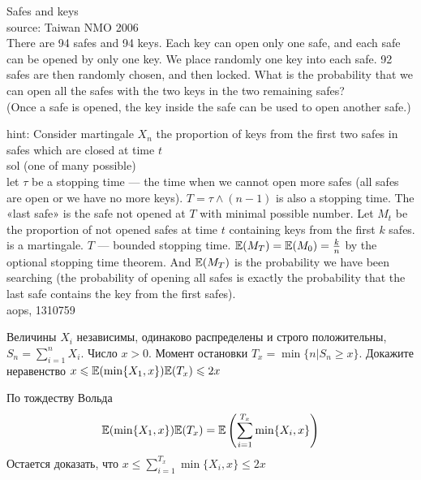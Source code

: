 \begin{problem}
Safes and keys \\
source: Taiwan NMO 2006\\
There are 94 safes and 94 keys. Each key can open only one safe, and each safe can be opened by only one key. We place randomly one key into each safe. 92 safes are then randomly chosen, and then locked. What is the probability that we can open all the safes with the two keys in the two remaining safes?\\
(Once a safe is opened, the key inside the safe can be used to open another safe.)

\begin{sol}

hint: Consider martingale $X_{n}$ the proportion of keys from the first two safes in safes which are closed at time $t$ \\
sol (one of many possible) \\
let $\tau$ be a stopping time — the time when we cannot open more safes (all safes are open or we have no more keys). $T=\tau \wedge (n-1)$ is also a stopping time. The «last safe» is the safe not opened at $T$ with minimal possible number. Let $M_{t}$  be the proportion of not opened safes at time $t$  containing keys from the first $k$ safes.  is a martingale. $T$ — bounded stopping time. $\mathbb{E}(M_{T}) = \mathbb{E}(M_{0}) = \frac {k}{n}$ by the optional stopping time theorem. And $\mathbb{E}(M_{T})$ is the probability we have been searching (the probability of opening all safes is exactly the probability that the last safe contains the key from the first  safes). \\
aops, 1310759
\end{sol}
\end{problem}

\begin{problem}
Величины $X_i$ независимы, одинаково распределены и строго положительны, $S_n=\sum_{i=1}^n X_i$. Число $x>0$. Момент остановки $T_x=\min\{n|S_n\geq x\}$. Докажите неравенство $x\leqslant \mathbb{E}(\min\{X_1,x\})\mathbb{E}(T_x)\leqslant 2x$

\begin{sol}
По тождеству Вольда
\begin{equation}
 \mathbb{E}(\min\{X_1,x\})\mathbb{E}(T_x)=\mathbb{E}\left(\sum_{i=1}^{T_x}\min\{X_i,x\} \right)
\end{equation}
Остается доказать, что $x\leq \sum_{i=1}^{T_x}\min\{X_i,x\}\leq 2x $
\end{sol}
\end{problem}


